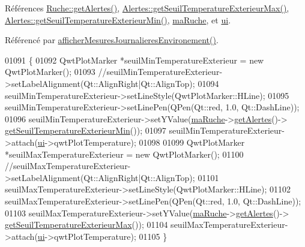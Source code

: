 Références \hyperlink{class_ruche_a9edbc2e81ccb2cb76de43639bcb16ec1}{Ruche\+::get\+Alertes()}, \hyperlink{class_alertes_a00d834877e1fc34d7e0659ef6963ac4f}{Alertes\+::get\+Seuil\+Temperature\+Exterieur\+Max()}, \hyperlink{class_alertes_a4451c6b077256d838e584a073444d83d}{Alertes\+::get\+Seuil\+Temperature\+Exterieur\+Min()}, \hyperlink{class_ruche_ihm_a43a6b1fa31f4fba58d919daae3707b38}{ma\+Ruche}, et \hyperlink{class_ruche_ihm_a64786058bd7f88ca2f1e9743bb27c25b}{ui}.



Référencé par \hyperlink{class_ruche_ihm_a5ee5942435915ca134765f42ff4b9061}{afficher\+Mesures\+Journalieres\+Environement()}.


\begin{DoxyCode}
01091 \{
01092     QwtPlotMarker *seuilMinTemperatureExterieur = \textcolor{keyword}{new} QwtPlotMarker();
01093     \textcolor{comment}{//seuilMinTemperatureExterieur->setLabelAlignment(Qt::AlignRight|Qt::AlignTop);}
01094     seuilMinTemperatureExterieur->setLineStyle(QwtPlotMarker::HLine);
01095     seuilMinTemperatureExterieur->setLinePen(QPen(Qt::red, 1.0, Qt::DashLine));
01096     seuilMinTemperatureExterieur->setYValue(\hyperlink{class_ruche_ihm_a43a6b1fa31f4fba58d919daae3707b38}{maRuche}->\hyperlink{class_ruche_a9edbc2e81ccb2cb76de43639bcb16ec1}{getAlertes}()->
      \hyperlink{class_alertes_a4451c6b077256d838e584a073444d83d}{getSeuilTemperatureExterieurMin}());
01097     seuilMinTemperatureExterieur->attach(\hyperlink{class_ruche_ihm_a64786058bd7f88ca2f1e9743bb27c25b}{ui}->qwtPlotTemperature);
01098 
01099     QwtPlotMarker *seuilMaxTemperatureExterieur = \textcolor{keyword}{new} QwtPlotMarker();
01100     \textcolor{comment}{//seuilMaxTemperatureExterieur->setLabelAlignment(Qt::AlignRight|Qt::AlignTop);}
01101     seuilMaxTemperatureExterieur->setLineStyle(QwtPlotMarker::HLine);
01102     seuilMaxTemperatureExterieur->setLinePen(QPen(Qt::red, 1.0, Qt::DashLine));
01103     seuilMaxTemperatureExterieur->setYValue(\hyperlink{class_ruche_ihm_a43a6b1fa31f4fba58d919daae3707b38}{maRuche}->\hyperlink{class_ruche_a9edbc2e81ccb2cb76de43639bcb16ec1}{getAlertes}()->
      \hyperlink{class_alertes_a00d834877e1fc34d7e0659ef6963ac4f}{getSeuilTemperatureExterieurMax}());
01104     seuilMaxTemperatureExterieur->attach(\hyperlink{class_ruche_ihm_a64786058bd7f88ca2f1e9743bb27c25b}{ui}->qwtPlotTemperature);
01105 \}
\end{DoxyCode}
\mbox{\label{class_ruche_ihm_a0f44cb030202047fa9a364dfcbf9a13f}} 
